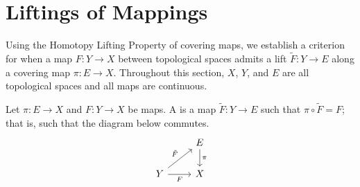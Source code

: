 \documentclass[../Moduli_Spaces_of_Riemann_Surfaces.tex]{subfiles}
\begin{document}
    \section{Liftings of Mappings}\label{CS:sec:lifting_criterion}
    Using the Homotopy Lifting Property of covering maps, we establish a criterion for when a map $F:Y\to X$ between topological spaces admits a lift $\widetilde{F}:Y\to E$ along a covering map $\pi:E\to X$. Throughout this section, $X$, $Y$, and $E$ are all topological spaces and all maps are continuous.
    \begin{definition}
        Let $\pi:E\to X$ and $F:Y\to X$ be maps. A  is a map $\widetilde{F}:Y\to E$ such that $\pi\circ\widetilde{F}=F$; that is, such that the diagram below commutes.
        \begin{equation*}
            \begin{tikzcd}
                & E \ar[d, "\pi"] \\
                Y \ar[ur, "\tilde{F}"] \ar[r, "F"'] & X
            \end{tikzcd}
        \end{equation*}
    \end{definition}
\end{document}
